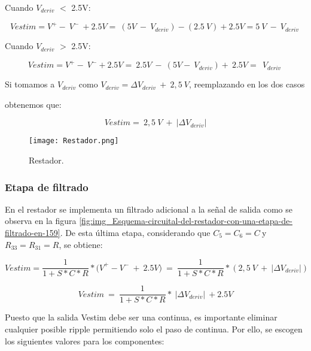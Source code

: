 \noindent Cuando $V_{deriv}$ $\mathrm{<}$ 2.5V:

\begin{equation} \label{eq_rest_1}
	Vestim=V^+-\ V^-\ +2.5V=\ (5V\ -\ V_{deriv})-(2.5\ V)+2.5V=5\ V\ -\ V_{deriv}\  
\end{equation}

\noindent Cuando $V_{deriv}$ $\mathrm{>}$ 2.5V: 

\begin{equation} \label{eq_rest_2}
	{Vestim=V}^+-\ V^-+2.5V=\ 2.5V\ -\ (5V-\ V_{deriv})+\ 2.5V=\ \ V_{deriv}\ 
\end{equation}

\noindent Si tomamos a $V_{deriv}$ como $V_{deriv}=\mathit{\Delta}V_{deriv}\ +\ 2,5\ V$, reemplazando en los dos casos

\noindent obtenemos que:

\begin{equation} \label{eq_rest_3}
	Vestim=\ 2,5\ V\ +\ |\mathit{\Delta}V_{deriv}|
\end{equation}

\begin{figure}[H]
	\centering
	\texttt{[image: Restador.png]}
	\caption{Restador.}
	\label{fig:img_Restador}
\end{figure}

\subsubsection{Etapa de filtrado}

\noindent En el restador se implementa un filtrado adicional a la se\~{n}al de salida como se observa en la figura  \ref{fig:img_Esquema-circuital-del-restador-con-una-etapa-de-filtrado-en-159}. De esta \'{u}ltima etapa, considerando que $C_5=C_6=C\ $y $R_{33}=R_{31}=R$, se obtiene:

\begin{equation} \label{eq_Vestim_1}
	{Vestim}=\frac{1}{1+S*C*R}*{(V}^+-V^-\ +\ 2.5V)\ =\ \frac{1}{1+S*C*R}*(2,5\ V\ +\ |\mathit{\Delta}V_{deriv}|)
\end{equation}

\begin{equation} \label{eq_Vestim_2}
	Vestim\ =\ \frac{1}{1+S*C*R}*\ |\mathit{\Delta}V_{deriv}|\ +2.5V
\end{equation}



\noindent Puesto que la salida Vestim debe ser una continua, es importante eliminar cualquier posible ripple permitiendo solo el paso de continua. Por ello, se escogen los siguientes valores para los componentes:

